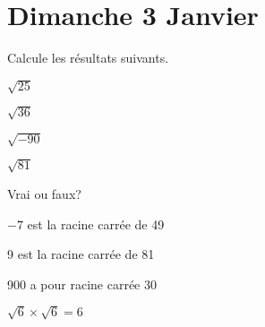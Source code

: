 \section{Dimanche 3 Janvier}

\begin{exercicefr}
    Calcule les résultats suivants.
    \begin{exerciceenum}
        \item $\sqrt{25}$
        \item $\sqrt{36}$
        \item $\sqrt{-90}$
        \item $\sqrt{81}$
    \end{exerciceenum}
\end{exercicefr}

\begin{exercicefr}
    Vrai ou faux?
    \begin{exerciceenumnoeq}
        \item $-7$ est la racine carrée de 49
        \item 9 est la racine carrée de 81
        \item 900 a pour racine carrée 30
        \item $\sqrt{6} \times \sqrt{6} = 6$
    \end{exerciceenumnoeq}
\end{exercicefr}
